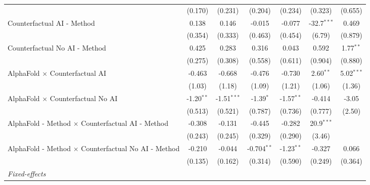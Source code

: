 \begin{tabular}{lcccccc}
                                                              & (0.170)       & (0.231)       & (0.204)       & (0.234)      & (0.323)       & (0.655)\\   
   Counterfactual AI - Method                                 & 0.138         & 0.146         & -0.015        & -0.077       & -32.7$^{***}$ & 0.469\\   
                                                              & (0.354)       & (0.333)       & (0.463)       & (0.454)      & (6.79)        & (0.879)\\   
   Counterfactual No AI - Method                              & 0.425         & 0.283         & 0.316         & 0.043        & 0.592         & 1.77$^{**}$\\   
                                                              & (0.275)       & (0.308)       & (0.558)       & (0.611)      & (0.904)       & (0.880)\\   
   AlphaFold $\times$ Counterfactual AI                       & -0.463        & -0.668        & -0.476        & -0.730       & 2.60$^{**}$   & 5.02$^{***}$\\   
                                                              & (1.03)        & (1.18)        & (1.09)        & (1.21)       & (1.06)        & (1.36)\\   
   AlphaFold $\times$ Counterfactual No AI                    & -1.20$^{**}$  & -1.51$^{***}$ & -1.39$^{*}$   & -1.57$^{**}$ & -0.414        & -3.05\\   
                                                              & (0.513)       & (0.521)       & (0.787)       & (0.736)      & (0.777)       & (2.50)\\   
   AlphaFold - Method $\times$ Counterfactual AI - Method     & -0.308        & -0.131        & -0.445        & -0.282       & 20.9$^{***}$  &   \\   
                                                              & (0.243)       & (0.245)       & (0.329)       & (0.290)      & (3.46)        &   \\   
   AlphaFold - Method $\times$ Counterfactual No AI - Method  & -0.210        & -0.044        & -0.704$^{**}$ & -1.23$^{**}$ & -0.327        & 0.066\\   
                                                              & (0.135)       & (0.162)       & (0.314)       & (0.590)      & (0.249)       & (0.364)\\   
   \midrule
   \emph{Fixed-effects}\\

\end{tabular}
